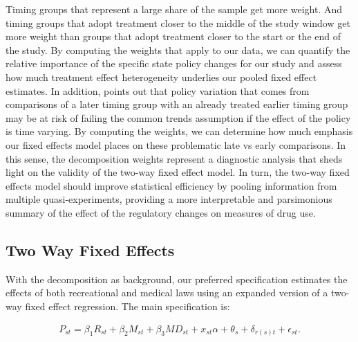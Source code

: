 \documentclass[12pt]{article}%
\begin{document}
Timing groups that represent a large share of the sample get more weight. And timing groups that adopt treatment closer to the middle of the study window get more weight than groups that adopt treatment closer to the start or the end of the study. By computing the weights that apply to our data, we can quantify the relative importance of the specific state policy changes for our study and assess how much treatment effect heterogeneity underlies our pooled fixed effect estimates. In addition, \cite{Goodman-Bacon2018} points out that policy variation that comes from comparisons of a later timing group with an already treated earlier timing group may be at risk of failing the common trends assumption if the effect of the policy is time varying. By computing the weights, we can determine how much emphasis our fixed effects model places on these problematic late vs early comparisons. In this sense, the decomposition weights represent a diagnostic analysis that sheds light on the validity of the two-way fixed effect model. In turn, the two-way fixed effects model should improve statistical efficiency by pooling information from multiple quasi-experiments, providing a more interpretable and parsimonious summary of the effect of the regulatory changes on measures of drug use.

\subsection{Two Way Fixed Effects}
\label{sec:research_design_twoway_fe}

With the decomposition as background, our preferred specification estimates the effects of both recreational and medical laws using an expanded version of a two-way fixed effect regression. The main specification is:

\begin{align}
P_{st}=\beta_1 R_{st}+\beta_2 M_{st}+\beta_3 MD_{st}+x_{st} \alpha+\theta_s+\delta_{r(s)t}+\epsilon_{st}. \label{eq:two_way_fe}
\end{align}
\end{document}
